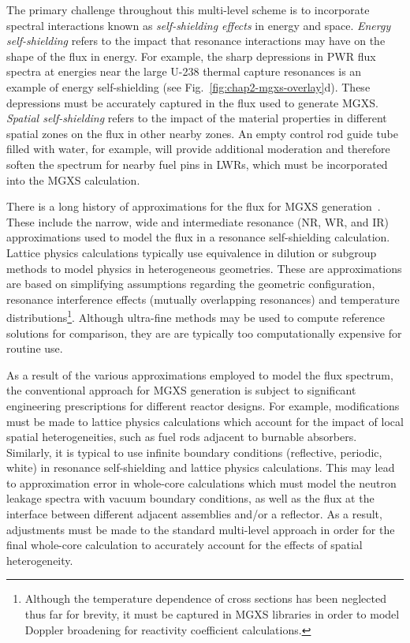 
The primary challenge throughout this multi-level scheme is to incorporate spectral interactions known as \textit{self-shielding effects} in energy and space. \textit{Energy self-shielding} refers to the impact that resonance interactions may have on the shape of the flux in energy. For example, the sharp depressions in \ac{PWR} flux spectra at energies near the large U-238 thermal capture resonances is an example of energy self-shielding (see Fig.~\ref{fig:chap2-mgxs-overlay}d). These depressions must be accurately captured in the flux used to generate \ac{MGXS}. \textit{Spatial self-shielding} refers to the impact of the material properties in different spatial zones on the flux in other nearby zones. An empty control rod guide tube filled with water, for example, will provide additional moderation and therefore soften the spectrum for nearby fuel pins in \ac{LWRs}, which must be incorporated into the \ac{MGXS} calculation.

There is a long history of approximations for the flux for \ac{MGXS} generation~\cite{cacuci2010handbook}. These include the narrow, wide and intermediate resonance (NR, WR, and IR) approximations used to model the flux in a resonance self-shielding calculation. Lattice physics calculations typically use equivalence in dilution or subgroup methods to model physics in heterogeneous geometries. These are approximations are based on simplifying assumptions regarding the geometric configuration, resonance interference effects (mutually overlapping resonances) and temperature distributions\footnote{Although the temperature dependence of cross sections has been neglected thus far for brevity, it must be captured in \ac{MGXS} libraries in order to model Doppler broadening for reactivity coefficient calculations.}. Although ultra-fine methods may be used to compute reference solutions for comparison, they are are typically too computationally expensive for routine use. 

As a result of the various approximations employed to model the flux spectrum, the conventional approach for \ac{MGXS} generation is subject to significant engineering prescriptions for different reactor designs.  For example, modifications must be made to lattice physics calculations which account for the impact of local spatial heterogeneities, such as fuel rods adjacent to burnable absorbers. Similarly, it is typical to use infinite boundary conditions (reflective, periodic, white) in resonance self-shielding and lattice physics calculations. This may lead to approximation error in whole-core calculations which must model the neutron leakage spectra with vacuum boundary conditions, as well as the flux at the interface between different adjacent assemblies and/or a reflector. As a result, adjustments must be made to the standard multi-level approach in order for the final whole-core calculation to accurately account for the effects of spatial heterogeneity.


